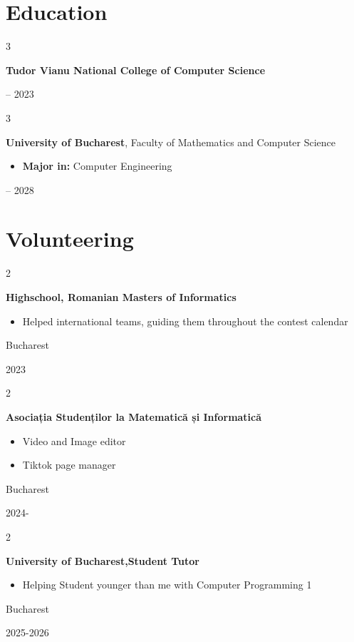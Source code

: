 \documentclass[10pt, letterpaper]{article}
\newenvironment{highlights}{
    \begin{itemize}[
        topsep=0.10 cm,
        parsep=0.10 cm,
        partopsep=0pt,
        itemsep=0pt,
        leftmargin=0.4 cm + 10pt
    ]
}{
    \end{itemize}
} %
\newenvironment{twocolentry}[2][]{
    \onecolentry
    \def\secondColumn{#2}
    \setcolumnwidth{\fill, 4.5 cm}
    \begin{paracol}{2}
}{
    \switchcolumn \raggedleft \secondColumn
    \end{paracol}
    \endonecolentry
} %
\newenvironment{threecolentry}[3][]{
    \onecolentry
    \def\thirdColumn{#3}
    \setcolumnwidth{1 cm, \fill, 4.5 cm}
    \begin{paracol}{3}
    {\raggedright #2} \switchcolumn
}{
    \switchcolumn \raggedleft \thirdColumn
    \end{paracol}
    \endonecolentry
} %
\begin{document}
    \section{Education}

        \begin{threecolentry}{\textbf{}}{
            2019 – 2023
        }
            \textbf{Tudor Vianu National College of Computer Science}
        \end{threecolentry}
        
        \begin{threecolentry}{\textbf{}}{
            2024 – 2028
        }
            \textbf{University of Bucharest}, Faculty of Mathematics and Computer Science
            \begin{highlights}
                \item \textbf{Major in:} Computer Engineering
            \end{highlights}

        \end{threecolentry}        

    
    \section{Volunteering}        
        \begin{twocolentry}{
            Bucharest

        2023
        }
            \textbf{Highschool, Romanian Masters of Informatics}
            \begin{highlights}
                \item Helped international teams, guiding them throughout the contest calendar
            \end{highlights}
        \end{twocolentry}
        
        \begin{twocolentry}{
            Bucharest

        2024-
        }
            \textbf{Asociația Studenților la Matematică și Informatică}
            \begin{highlights}
                \item Video and Image editor
                \item Tiktok page manager
            \end{highlights}
        \end{twocolentry}

        \begin{twocolentry}{
            Bucharest

        2025-2026
        }
            \textbf{University of Bucharest,Student Tutor}
            \begin{highlights}
                \item Helping Student younger than me with Computer Programming 1
            \end{highlights}
        \end{twocolentry}
\end{document}
